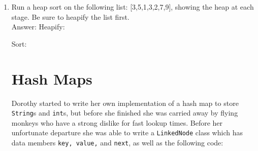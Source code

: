 \documentclass[11pt]{article}
\newenvironment{answer}{\large\lstset{basicstyle=\large}\color{white} \small{Answer:}\large}{}
\newenvironment{answer}{\large\lstset{basicstyle=\large}\color{red} \small{Answer:}\large}{}
\begin{document}
\begin{enumerate}
\item Run a heap sort on the following list: [3,5,1,3,2,7,9], showing the heap at each stage. Be sure to heapify the list first. \\
\begin{answer}
Heapify:  \newline
	[\underline{3}, 5, 1, 3, 2, 7, 9]       \newline 

Sort:      \newline
	[\underline{9}, 7, 5, 3, 3, 2, 1] \newline
	[9, 7, 5, 3, 3, 2, 1] \newline
\end{answer}



\newpage
\section*{Hash Maps}

Dorothy started to write her own implementation of a hash map to store {\tt String}s and {\tt int}s, but before she finished she was carried away by flying monkeys who have a strong dislike for fast lookup times. Before her unfortunate departure she was able to write a {\tt LinkedNode} class which has data members {\tt key, value,} and {\tt next}, as well as the following code:


\end{enumerate}
\end{document}
